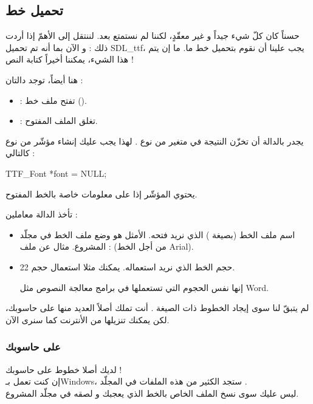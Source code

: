 \subsection{تحميل خط}

حسناً كان كلّ شيء جيداً و غير معقّدٍ، لكننا لم نستمتع بعد. لننتقل إلى الأهمّ إذا أردت ذلك : و الآن بما أنه تم تحميل 
\textenglish{SDL\_ttf}،
يجب علينا أن نقوم بتحميل خط ما. ما إن يتم هذا الشيء، يمكننا أخيراً كتابة النص !

هنا أيضاً، توجد دالتان :
\begin{itemize}
	\item {} :
	تفتح ملف خط
	().
	\item {} : 
	تغلق الملف المفتوح.
\end{itemize}

يجدر بالدالة
أن تخزّن النتيجة في متغير من نوع
.
لهذا يجب عليك إنشاء مؤشّر من نوع
كالتالي :

\begin{Csource}
TTF_Font *font = NULL;
\end{Csource}

يحتوي المؤشّر
إذا على معلومات خاصة بالخط المفتوح.

تأخذ الدالة 
معاملين :

\begin{itemize}
	\item اسم ملف الخط (بصيغة
	)
	الذي نريد فتحه. الأمثل هو وضع ملف الخط في مجلّد المشروع. مثال عن ملف :
	(من أجل الخط
	\textenglish{Arial}).
	\item حجم الخط الذي نريد استعماله. يمكنك مثلا استعمال حجم 22.
	
	إنها نفس الحجوم التي تستعملها في برامج معالجة النصوص مثل
	\textenglish{Word}.
\end{itemize}

لم يتبقّ لنا سوى إيجاد الخطوط ذات الصيغة
.
أنت تملك أصلاً العديد منها على حاسوبك، لكن يمكنك تنزيلها من الأنترنت كما سنرى الآن.

\subsubsection{على حاسوبك}

لديك أصلا خطوط على حاسوبك !\\
إن كنت تعمل بـ\textenglish{Windows}،
 ستجد الكثير من هذه الملفات في المجلّد
.\\
ليس عليك سوى نسخ الملف الخاص بالخط الذي يعجبك و لصقه في مجلّد المشروع. 

